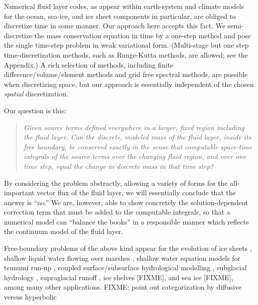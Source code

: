 \documentclass[final,leqno,onefignum,onetabnum]{siamltex1213bueler}
\begin{document}
Numerical fluid layer codes, as appear within earth-system and climate models for the ocean, sea-ice, and ice sheet components in particular, are obliged to discretize time in some manner.  Our approach here accepts this fact.  We semi-discretize the mass conservation equation in time by a one-step method and pose the single time-step problem in weak variational form.  (Multi-stage but one step time-discretization methods, such as Runge-Kutta methods, are allowed; see the Appendix.)  A rich selection of methods, including finite difference/volume/element methods and grid free spectral methods, are possible when discretizing space, but our approach is essentially independent of the chosen \emph{spatial} discretization.

Our question is this:
  \begin{quote}
  \emph{Given source terms defined everywhere in a larger, fixed region including the fluid layer.  Can the discrete, modeled mass of the fluid layer, inside its free boundary, be conserved exactly in the sense that computable space-time integrals of the source terms over the changing fluid region, and over one time step, equal the change in discrete mass in that time step?}
  \end{quote}
By considering the problem abstractly, allowing a variety of forms for the all-important vector flux of the fluid layer, we will essentially conclude that the answer is ``no.''  We are, however, able to show concretely the solution-dependent correction term that must be added to the computable integrals, so that a numerical model can ``balance the books'' in a responsible manner which reflects the continuum model of the fluid layer.

Free-boundary problems of the above kind appear for the evolution of ice sheets \cite{BLKCB,CDDSV,EgholmNielsen2010,JouvetBueler2012}, shallow liquid water flowing over marshes \cite{AlonsoSantillanaDawson}, shallow water equation models for tsunumi run-up \cite{LeVequeGeorge2008}, coupled surface/subsurface hydrological modelling \cite{Maxwelletal2014}, subglacial hydrology \cite{AschwandenBuelerKhroulevBlatter,BuelervanPeltDRAFT,Schoofetal2012}, supraglacial runoff \cite{AschwandenBuelerKhroulevBlatter}, ice shelves [FIXME], and sea ice [FIXME], among many other applications.  FIXME: point out categorization by diffusive versus hyperbolic
\end{document}
